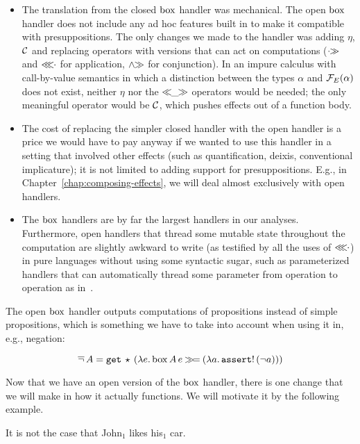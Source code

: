 \begin{itemize}
\item The translation from the closed $\mathrm{box}$ handler was mechanical. The
  open $\mathrm{box}$ handler does not include any ad hoc features built in to make
  it compatible with presuppositions. The only changes we made to the
  handler was adding $\eta$, $\mathcal{C}$ and replacing operators with versions
  that can act on computations ($\mathbin{\cdot\!\!\gg}$ and $\mathbin{\lll\!\!\cdot}$ for application, $\mathbin{\land\!\!\gg}$
  for conjunction). In an impure calculus with call-by-value semantics in
  which a distinction between the types $\alpha$ and $\mathcal{F}_E(\alpha)$ does
  not exist, neither $\eta$ nor the $\mathbin{\ll\!\!\_\!\!\gg}$ operators would be needed;
  the only meaningful operator would be $\mathcal{C}$, which pushes effects out of
  a function body.
\item The cost of replacing the simpler closed handler with the open
  handler is a price we would have to pay anyway if we wanted to use this
  handler in a setting that involved other effects (such as quantification,
  deixis, conventional implicature); it is not limited to adding support
  for presuppositions. E.g., in Chapter~\ref{chap:composing-effects}, we
  will deal almost exclusively with open handlers.
\item The $\mathrm{box}$ handlers are by far the largest handlers in our
  analyses. Furthermore, open handlers that thread some mutable state
  throughout the computation are slightly awkward to write (as testified by
  all the uses of $\mathbin{\lll\!\!\cdot}$) in pure languages without using some syntactic
  sugar, such as parameterized handlers that can automatically thread some
  parameter from operation to operation as
  in~\cite{kammar2013handlers,kiselyov2015freer}.
\end{itemize}

The open $\mathrm{box}$ handler outputs computations of propositions instead of
simple propositions, which is something we have to take into account when
using it in, e.g., negation:

$$
\mathop{\overline{\lnot}} A = \mathtt{get}\,\star\,(\lambda e.\, \mathrm{box}\,A\,e \mathbin{\gg\!=} (\lambda a.\, \mathtt{assert}!\,(\lnot a)))
$$

Now that we have an open version of the $\mathrm{box}$ handler, there is one change
that we will make in how it actually functions. We will motivate it by the
following example.

\begin{exe}
  \ex \label{ex:not-john-car} It is not the case that John$_1$ likes his$_1$ car.
\end{exe}

